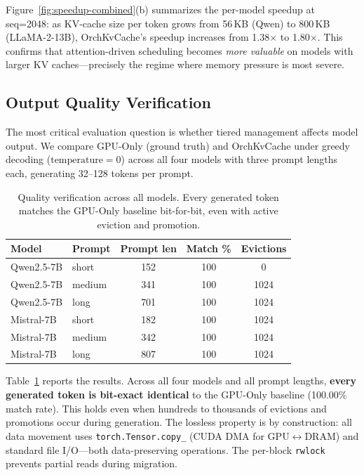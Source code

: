 \documentclass[conference]{IEEEtran}
\begin{document}
Figure~\ref{fig:speedup-combined}(b) summarizes the per-model speedup at seq=2048: as KV-cache size per token grows from 56\,KB (Qwen) to 800\,KB (LLaMA-2-13B), OrchKvCache's speedup increases from 1.38$\times$ to 1.80$\times$. This confirms that attention-driven scheduling becomes \emph{more valuable} on models with larger KV caches---precisely the regime where memory pressure is most severe.

\subsection{Output Quality Verification}
\label{sec:quality-eval}

The most critical evaluation question is whether tiered management affects model output. We compare GPU-Only (ground truth) and OrchKvCache under greedy decoding ($\text{temperature}{=}0$) across all four models with three prompt lengths each, generating 32--128 tokens per prompt.

\begin{table}[t]
\centering
\caption{Quality verification across all models. Every generated token matches the GPU-Only baseline bit-for-bit, even with active eviction and promotion.}
\label{tab:quality}
\small
\begin{tabular}{@{}llccc@{}}
\toprule
Model & Prompt & Prompt len & Match \% & Evictions \\
\midrule
Qwen2.5-7B  & short  & 152 & 100 & 0    \\
Qwen2.5-7B  & medium & 341 & 100 & 1024 \\
Qwen2.5-7B  & long   & 701 & 100 & 1024 \\
\midrule
Mistral-7B  & short  & 182 & 100 & 1024 \\
Mistral-7B  & medium & 342 & 100 & 1024 \\
Mistral-7B  & long   & 807 & 100 & 1024 \\
\bottomrule
\end{tabular}
\end{table}

Table~\ref{tab:quality} reports the results. Across all four models and all prompt lengths, \textbf{every generated token is bit-exact identical} to the GPU-Only baseline (100.00\% match rate). This holds even when hundreds to thousands of evictions and promotions occur during generation. The lossless property is by construction: all data movement uses \texttt{torch.Tensor.copy\_} (CUDA DMA for GPU$\leftrightarrow$DRAM) and standard file I/O---both data-preserving operations. The per-block \texttt{rwlock} prevents partial reads during migration.
\end{document}
